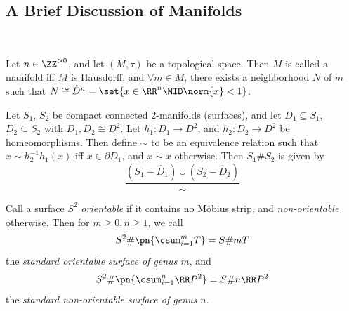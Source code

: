 \documentclass{fkbook}
\theoremstyle{snazzydefinition}
\begin{document}
\begin{adjustwidth}{1em}{1em}
  \section{A Brief Discussion of Manifolds}~
  \begin{definition}[Manifolds]
    Let $n \in \ZZ^{>0}$, and let $(M, \tau)$ be a topological space.
    Then $M$ is called a manifold iff $M$ is Hausdorff, and $\forall m
    \in M$, there exists a neighborhood $N$ of $m$ such that $N \cong
    \mathring{D}^n = \set{x \in \RR^n \MID \norm{x} < 1}$.
  \end{definition}
  \begin{definition}
    Let $S_1$, $S_2$ be compact connected 2-manifolds (surfaces), and
    let $D_1 \subseteq S_1$, $D_2 \subseteq S_2$ with $D_1, D_2 \cong
    D^2$. Let $h_1 : D_1 \to D^2$, and $h_2 : D_2 \to D^2$ be
    homeomorphisms. Then define $\sim$ to be an equivalence relation
    such that $x \sim h^{-1}_2 h_1(x)$ iff $x \in \partial D_1$, and
    $x \sim x$ otherwise. Then $S_1 \# S_2$ is given by
    \[
      \frac{(S_1 - \mathring{D_1}) \cup (S_2 - \mathring{D_2})}{\sim}
    \]
  \end{definition}
  \begin{definition}
    Call a surface $S^2$ \emph{orientable} if it contains no
    M\"{o}bius strip, and \emph{non-orientable} otherwise. Then for $m
    \geq 0, n \geq 1$, we call
    \[
      S^2 \# \pn{\csum_{i=1}^m T} = S \# mT
    \]
    the \emph{standard orientable surface of genus $m$}, and
    \[
      S^2 \# \pn{\csum_{i=1}^n \RR P^2} = S \# n\RR P^2
    \]
    the \emph{standard non-orientable surface of genus $n$}.
  \end{definition}

\end{adjustwidth}
\end{document}
